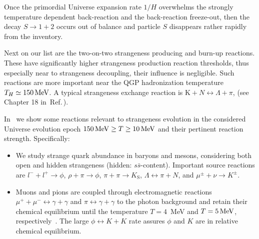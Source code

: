 Once the primordial Universe expansion rate $1/H$ overwhelms the strongly temperature dependent back-reaction and the back-reaction freeze-out, then the decay $S\rightarrow 1+2$ occurs out of balance and particle $S$ disappears rather rapidly from the inventory. 

Next on our list are the two-on-two strangeness producing and burn-up reactions. These have significantly higher strangeness production reaction thresholds, thus especially near to strangeness decoupling, their influence is negligible. Such reactions are more important near the QGP hadronization temperature $T_H\simeq 150\text{\,MeV}$. A typical strangeness exchange reaction is $\mathrm{K}+N\leftrightarrow \Lambda+\pi$, (see Chapter 18 in~Ref.\,\cite{Letessier:2002ony}).

In~ we show some reactions relevant to strangeness evolution in the considered Universe evolution epoch $150\text{\,MeV}\ge T\ge 10\text{\,MeV}$ and their pertinent reaction strength. Specifically:
\begin{itemize}
\item
We study strange quark abundance in baryons and mesons, considering both open and hidden strangeness (hidden: $s\bar s$-content). Important source reactions are $l^-+l^+\rightarrow\phi$, $\rho+\pi\rightarrow\phi$, $\pi+\pi\rightarrow K_\mathrm{S}$, $\Lambda \leftrightarrow \pi+ N$, and $\mu^\pm+\nu\rightarrow K^\pm$. 
\item
Muons and pions are coupled through electromagnetic reactions $\mu^++\mu^-\leftrightarrow\gamma+\gamma$ and $\pi\leftrightarrow\gamma+\gamma$ to the photon background and retain their chemical equilibrium until the temperature $T =4$\, MeV and $T=5\text{\,MeV}$, respectively~\cite{Rafelski:2021aey,Kuznetsova:2008jt}. The large $\phi\leftrightarrow K+K$ rate assures $\phi$ and $K$ are in relative chemical equilibrium.
\end{itemize}

